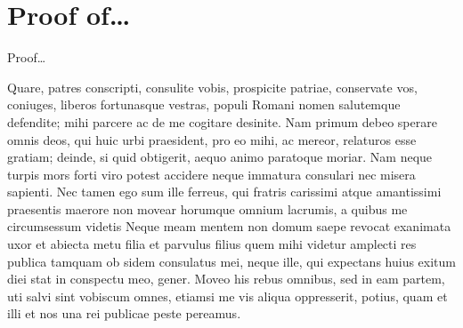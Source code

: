 \documentclass[a4paper,12pt,twoside,swedish]{report}
\begin{document}





\pagestyle{empty}

\appendix

\chapter{Proof of\dots}

\label{app:proof1}

\thispagestyle{empty}

Proof\dots

Quare, patres conscripti, consulite vobis, prospicite patriae,
conservate vos, coniuges, liberos fortunasque vestras, populi Romani
nomen salutemque defendite; mihi parcere ac de me cogitare desinite. Nam
primum debeo sperare omnis deos, qui huic urbi praesident, pro eo mihi,
ac mereor, relaturos esse gratiam; deinde, si quid obtigerit, aequo
animo paratoque moriar. Nam neque turpis mors forti viro potest accidere
neque immatura consulari nec misera sapienti. Nec tamen ego sum ille
ferreus, qui fratris carissimi atque amantissimi praesentis maerore non
movear horumque omnium lacrumis, a quibus me circumsessum videtis Neque
meam mentem non domum saepe revocat exanimata uxor et abiecta metu filia
et parvulus filius quem mihi videtur amplecti res publica tamquam ob
sidem consulatus mei, neque ille, qui expectans huius exitum diei stat
in conspectu meo, gener. Moveo his rebus omnibus, sed in eam partem, uti
salvi sint vobiscum omnes, etiamsi me vis aliqua oppresserit, potius,
quam et illi et nos una rei publicae peste pereamus.
\end{document}
